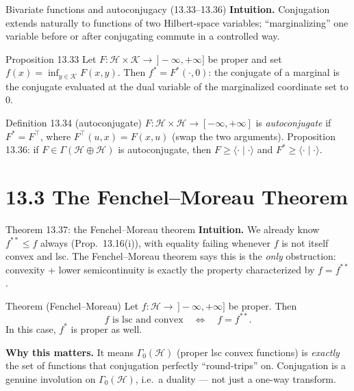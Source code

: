\documentclass[aspectratio=169,10pt]{beamer}
\newcommand{\Hil}{\mathcal{H}}
\newcommand{\Kil}{\mathcal{K}}
\newcommand{\inner}[2]{\langle #1 \mid #2 \rangle}
\newcommand{\GammaZero}{\Gamma_0(\Hil)}
\newcommand{\conj}[1]{#1^{*}}
\newcommand{\biconj}[1]{#1^{**}}
\begin{document}
\begin{frame}{Bivariate functions and autoconjugacy (13.33--13.36)}
  \textbf{Intuition.} Conjugation extends naturally to functions of two
  Hilbert-space variables; ``marginalizing'' one variable before or after
  conjugating commute in a controlled way.
  \begin{block}{Proposition 13.33}
    Let $F:\Hil\times\Kil\to\,]-\infty,+\infty]$ be proper and set
    $f(x)=\inf_{y\in\Kil}F(x,y)$. Then $\conj f = \conj F(\cdot,0)$: the
    conjugate of a marginal is the conjugate evaluated at the dual variable
    of the marginalized coordinate set to $0$.
  \end{block}
  \begin{block}{Definition 13.34 (autoconjugate)}
    $F:\Hil\times\Hil\to[-\infty,+\infty]$ is \emph{autoconjugate} if
    $\conj F = F^{\intercal}$, where $F^{\intercal}(u,x)=F(x,u)$ (swap the
    two arguments). Proposition 13.36: if $F\in\Gamma(\Hil\oplus\Hil)$ is
    autoconjugate, then $F\ge\inner\cdot\cdot$ and $\conj F\ge\inner\cdot\cdot$.
  \end{block}
\end{frame}

\section{13.3 The Fenchel--Moreau Theorem}

\begin{frame}{Theorem 13.37: the Fenchel--Moreau theorem}
  \textbf{Intuition.} We already know $\biconj f\le f$ always
  (Prop.\ 13.16(i)), with equality failing whenever $f$ is not itself
  convex and lsc. The Fenchel--Moreau theorem says this is the \emph{only}
  obstruction: convexity + lower semicontinuity is exactly the property
  characterized by $f=\biconj f$.
  \begin{alertblock}{Theorem (Fenchel--Moreau)}
    Let $f:\Hil\to\,]-\infty,+\infty]$ be proper. Then
    \[
      f \text{ is lsc and convex} \quad\Longleftrightarrow\quad f = \biconj f.
    \]
    In this case, $\conj f$ is proper as well.
  \end{alertblock}
  \textbf{Why this matters.} It means $\GammaZero$ (proper lsc convex
  functions) is \emph{exactly} the set of functions that conjugation
  perfectly ``round-trips'' on. Conjugation is a genuine involution on
  $\GammaZero$, i.e.\ a duality --- not just a one-way transform.
\end{frame}
\end{document}
